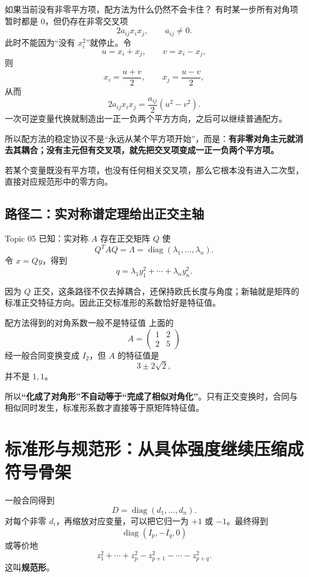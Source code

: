 \documentclass[11pt,a4paper]{ctexart}
\newcommand{\kw}[1]{\textbf{\color{deep}#1}}
\begin{document}
\begin{methodbox}{如果当前没有非零平方项，配方法为什么仍然不会卡住？}
有时某一步所有对角项暂时都是 $0$，但仍存在非零交叉项
\[
2a_{ij}x_ix_j,
\qquad a_{ij}\neq0.
\]
此时不能因为“没有 $x_i^2$”就停止。令
\[
u=x_i+x_j,
\qquad
v=x_i-x_j,
\]
则
\[
x_i=\frac{u+v}{2},
\qquad
x_j=\frac{u-v}{2},
\]
从而
\[
\boxed{2a_{ij}x_ix_j=\frac{a_{ij}}2(u^2-v^2).}
\]
一次可逆变量代换就制造出一正一负两个平方方向，之后可以继续普通配方。

所以配方法的稳定协议不是“永远从某个平方项开始”，而是：\kw{有非零对角主元就消去其耦合；没有主元但有交叉项，就先把交叉项变成一正一负两个平方项。}
\end{methodbox}

若某个变量既没有平方项，也没有任何相关交叉项，那么它根本没有进入二次型，直接对应规范形中的零方向。

\subsection{路径二：实对称谱定理给出正交主轴}

Topic 05 已知：实对称 $A$ 存在正交矩阵 $Q$ 使
\[
Q^TAQ=\Lambda
=\operatorname{diag}(\lambda_1,\dots,\lambda_n).
\]
令 $x=Qy$，得到
\[
q=\lambda_1y_1^2+\cdots+\lambda_ny_n^2.
\]

因为 $Q$ 正交，这条路径不仅去掉耦合，还保持欧氏长度与角度；新轴就是矩阵的标准正交特征方向。因此正交标准形的系数恰好是特征值。

\begin{warnbox}{配方法得到的对角系数一般不是特征值}
上面的
\[
A=\begin{pmatrix}1&2\\2&5\end{pmatrix}
\]
经一般合同变换变成 $I_2$，但 $A$ 的特征值是
\[
3\pm2\sqrt2,
\]
并不是 $1,1$。

所以\kw{“化成了对角形”不自动等于“完成了相似对角化”}。只有正交变换时，合同与相似同时发生，标准形系数才直接等于原矩阵特征值。
\end{warnbox}

\section{标准形与规范形：从具体强度继续压缩成符号骨架}

一般合同得到
\[
D=\operatorname{diag}(d_1,\dots,d_n).
\]
对每个非零 $d_i$，再缩放对应变量，可以把它归一为 $+1$ 或 $-1$。最终得到
\[
\boxed{
\operatorname{diag}(I_p,-I_q,0)
}
\]
或等价地
\[
z_1^2+\cdots+z_p^2
-z_{p+1}^2-\cdots-z_{p+q}^2.
\]
这叫\kw{规范形}。
\end{document}
